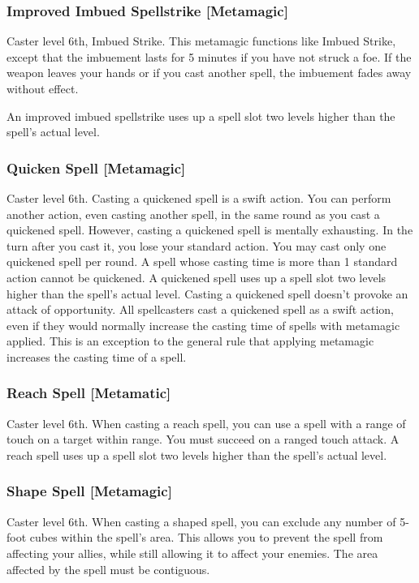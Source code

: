 \subsubsection{Improved Imbued Spellstrike [Metamagic]}
 Caster level 6th, Imbued Strike.
 This metamagic functions like Imbued Strike, except that the imbuement lasts for 5 minutes if you have not struck a foe. If the weapon leaves your hands or if you cast another spell, the imbuement fades away without effect.

An improved imbued spellstrike uses up a spell slot two levels higher than the spell's actual level.

\subsubsection{Quicken Spell [Metamagic]}
 Caster level 6th.
 Casting a quickened spell is a swift action. You can perform another action, even casting another spell, in the same round as you cast a quickened spell. However, casting a quickened spell is mentally exhausting. In the turn after you cast it, you lose your standard action. You may cast only one quickened spell per round. A spell whose casting time is more than 1 standard action cannot be quickened. A quickened spell uses up a spell slot two levels higher than the spell's actual level. Casting a quickened spell doesn't provoke an attack of opportunity.
 All spellcasters cast a quickened spell as a swift action, even if they would normally increase the casting time of spells with metamagic applied. This is an exception to the general rule that applying metamagic increases the casting time of a spell.

\subsubsection{Reach Spell [Metamatic]}
 Caster level 6th.
 When casting a reach spell, you can use a spell with a range of touch on a target within \rngclose range. You must succeed on a ranged touch attack. A reach spell uses up a spell slot two levels higher than the spell's actual level.

\subsubsection{Shape Spell [Metamagic]}
 Caster level 6th.
 When casting a shaped spell, you can exclude any number of 5-foot cubes within the spell's area. This allows you to prevent the spell from affecting your allies, while still allowing it to affect your enemies. The area affected by the spell must be contiguous.

